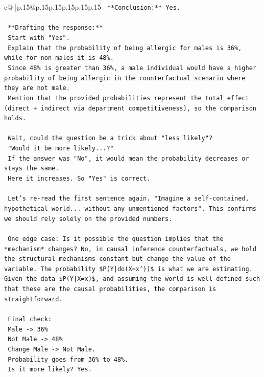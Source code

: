 \documentclass{article}
\begin{document}
{\begin{supertabular}{c@{$\;$}|p{.15\linewidth}@{}p{.15\linewidth}p{.15\linewidth}p{.15\linewidth}p{.15\linewidth}p{.15\linewidth}}
{{{\texttt{    **Conclusion:** Yes.} \\
\\ 
\texttt{    **Drafting the response:**} \\
\texttt{    Start with "Yes".} \\
\texttt{    Explain that the probability of being allergic for males is 36\%, while for non{-}males it is 48\%.} \\
\texttt{    Since 48\% is greater than 36\%, a male individual would have a higher probability of being allergic in the counterfactual scenario where they are not male.} \\
\texttt{    Mention that the provided probabilities represent the total effect (direct + indirect via department competitiveness), so the comparison holds.} \\
\\ 
\texttt{    Wait, could the question be a trick about "less likely"?} \\
\texttt{    "Would it be more likely...?"} \\
\texttt{    If the answer was "No", it would mean the probability decreases or stays the same.} \\
\texttt{    Here it increases. So "Yes" is correct.} \\
\\ 
\texttt{    Let's re{-}read the first sentence again. "Imagine a self{-}contained, hypothetical world... without any unmentioned factors". This confirms we should rely solely on the provided numbers.} \\
\\ 
\texttt{    One edge case: Is it possible the question implies that the *mechanism* changes? No, in causal inference counterfactuals, we hold the structural mechanisms constant but change the value of the variable. The probability \$P(Y|do(X=x'))\$ is what we are estimating. Given the data \$P(Y|X=x)\$, and assuming the world is well{-}defined such that these are the causal probabilities, the comparison is straightforward.} \\
\\ 
\texttt{    Final check:} \\
\texttt{    Male {-}> 36\%} \\
\texttt{    Not Male {-}> 48\%} \\
\texttt{    Change Male {-}> Not Male.} \\
\texttt{    Probability goes from 36\% to 48\%.} \\
\texttt{    Is it more likely? Yes.} \\
}}}
\end{supertabular}}
\end{document}
